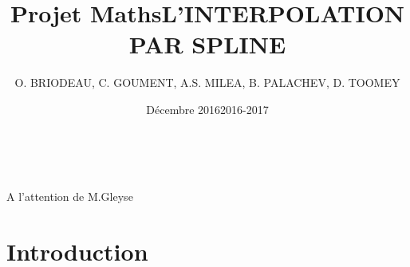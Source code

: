 \documentclass{article}
\title{Projet Maths}
\author{ O. BRIODEAU, C. GOUMENT, A.S. MILEA, B. PALACHEV, D. TOOMEY}
\date{D\'{e}cembre 2016}
\begin{document}
\maketitle

\vspace{10\baselineskip}
\begin{center}
\makeatother
\title{L'INTERPOLATION PAR SPLINE}\\
\end{center}

\vspace{12\baselineskip}
\begin{center}
A l'attention de M.Gleyse\\
\date{2016-2017}
\end{center}

\newpage
\renewcommand{\contentsname}{\begin{center}Sommaire \end{center}}
\tableofcontents

\newpage
\section{Introduction} 
\end{document}
